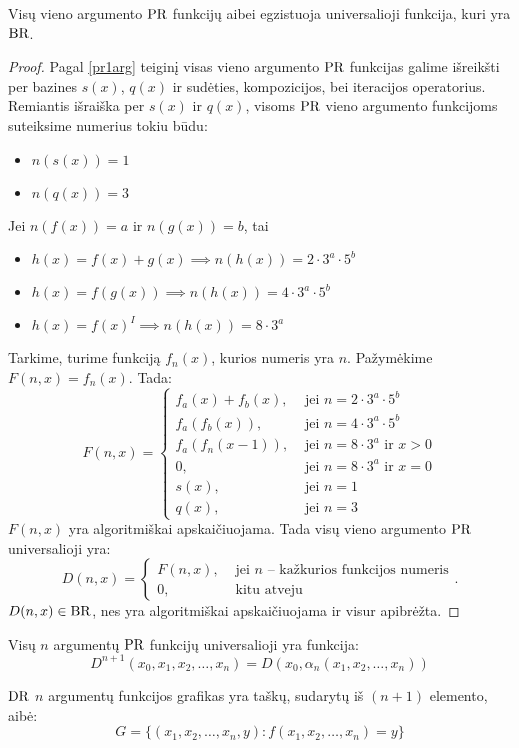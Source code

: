 \begin{prop}
  Visų vieno argumento $\mathop{\text{PR}}$ funkcijų aibei egzistuoja universalioji
  funkcija, kuri yra $\mathop{\text{BR}}$.
  \begin{proof}
    Pagal \ref{pr1arg} teiginį visas vieno argumento $\mathop{\text{PR}}$ funkcijas
    galime išreikšti per bazines $s(x)$, $q(x)$ ir sudėties, kompozicijos,
    bei iteracijos operatorius.
    Remiantis išraiška per $s(x)$ ir $q(x)$, visoms $\mathop{\text{PR}}$ vieno argumento
    funkcijoms suteiksime numerius tokiu būdu:
    \begin{itemize}
      \item $n(s(x)) = 1$
      \item $n(q(x)) = 3$
    \end{itemize}
    Jei $n(f(x)) = a$ ir $n(g(x)) = b$, tai
    \begin{itemize}
      \item $h(x) = f(x) + g(x) \implies n(h(x)) = 2 \cdot 3^a \cdot 5^b$
      \item $h(x) = f(g(x)) \implies n(h(x)) = 4 \cdot 3^a \cdot 5^b$
      \item $h(x) = f(x)^{I} \implies n(h(x)) = 8 \cdot 3^a$
    \end{itemize}
    Tarkime, turime funkciją $f_{n}(x)$, kurios numeris yra $n$. 
    Pažymėkime $F(n,x) = f_{n}(x)$. Tada:
    \[
    F(n,x) =%
    \begin{cases}
      f_{a}(x) + f_{b}(x), & \text{ jei } n = 2\cdot3^a\cdot5^b \\
      f_{a}(f_{b}(x)), & \text{ jei } n = 4\cdot3^a\cdot5^b \\
      f_{a}(f_{n}(x-1)), & \text{ jei } n = 8\cdot3^a \text{ ir } x > 0 \\
      0, & \text{ jei } n = 8\cdot3^a \text{ ir } x = 0 \\
      s(x), & \text{ jei } n = 1 \\
      q(x), & \text{ jei } n = 3
    \end{cases}
    \]
    $F(n,x)$ yra algoritmiškai apskaičiuojama. Tada visų vieno argumento
    $\mathop{\text{PR}}$ universalioji yra:
    \[
    D(n,x) =%
    \begin{cases}
      F(n,x), & \text{ jei $n$ – kažkurios funkcijos numeris} \\
      0, & \text{ kitu atveju }
    \end{cases}.
    \]
    $D(n,x) \in \mathop{\text{BR}}$, nes yra algoritmiškai apskaičiuojama ir visur 
    apibrėžta.
  \end{proof}
\end{prop}

\begin{prop}
  Visų $n$ argumentų $\mathop{\text{PR}}$ funkcijų universalioji yra funkcija:
  \[
  D^{n+1}(x_0,x_1,x_2,\dotsc,x_n) = D(x_0,\alpha_n(x_1,x_2,\dotsc,x_n))
  \]
\end{prop}

\begin{defn}
  $\mathop{\text{DR}}$ $n$ argumentų funkcijos grafikas yra taškų, sudarytų iš 
  $(n+1)$ elemento, aibė:
  \[
  G = \{ (x_1,x_2,\dotsc,x_n,y): f(x_1,x_2,\dotsc,x_n) = y \}
  \]
\end{defn}


